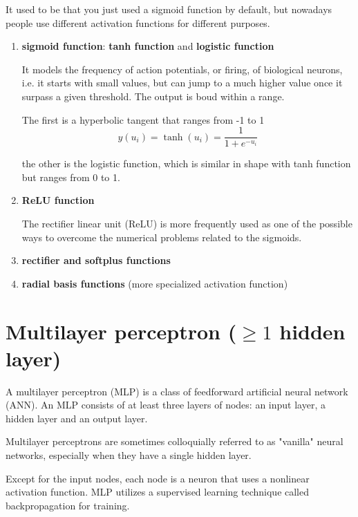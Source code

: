 It used to be that you just used a sigmoid function by default, but nowadays
people use different activation functions for different purposes.
\begin{enumerate}
  \item {\bf sigmoid function}: {\bf tanh function} and {\bf logistic function}
  
  
  It models the frequency of action potentials, or firing, of biological
  neurons, i.e. it starts with small values, but can jump to a much higher value
  once it surpass a given threshold. The output is boud within a range.
  
  The first is a hyperbolic tangent that ranges from -1 to 1
 \begin{equation}
 y(u_i) = \tanh(u_i) = \frac{1}{1 + e ^{-u_i}}
 \end{equation}
 
  the other is the logistic function, which is similar in shape with tanh
  function but ranges from 0 to 1.

  \item {\bf ReLU function}
  
  The rectifier linear unit (ReLU) is more frequently used as one of the
  possible ways to overcome the numerical problems related to the sigmoids.
  
  
  \item {\bf  rectifier and softplus functions}
  
  \item {\bf radial basis functions} (more specialized activation function)
\end{enumerate}

\section{Multilayer perceptron ($\ge 1$ hidden layer)}

A multilayer perceptron (MLP) is a class of feedforward artificial neural
network (ANN).  An MLP consists of at least three layers of nodes: an input
layer, a hidden layer and an output layer.

Multilayer perceptrons are sometimes colloquially referred to as "vanilla" 
neural networks, especially when they have a single hidden layer.

Except for the input nodes, each node is a neuron that uses a nonlinear
activation function. MLP utilizes a supervised learning technique called
backpropagation for training.

